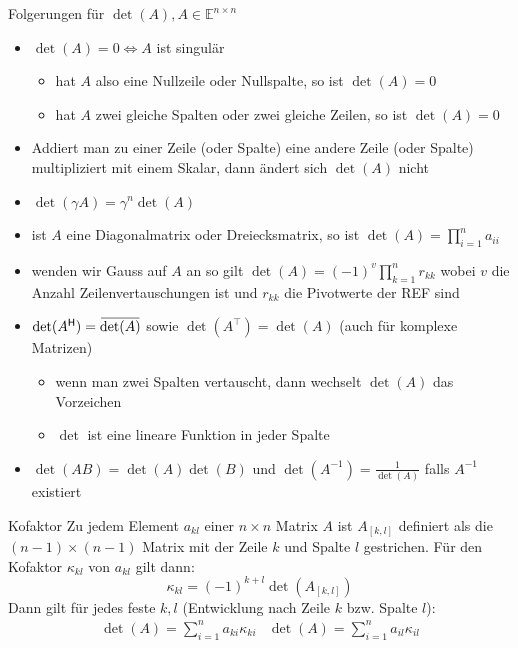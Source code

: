 \documentclass[a4paper,10pt]{article}
\newcommand*{\hermconj}{\mathsf{H}}
\def\E{\mathbb{E}}
\newcommand{\overbar}[1]{\mkern 1.5mu\overline{\mkern-1.5mu#1\mkern-1.5mu}\mkern 1.5mu}
\begin{document}
\begin{subbox}{Folgerungen für $\det(A), A \in \E^{n \times n}$}
  \begin{itemize}
    \item {
      $\det(A) = 0 \iff A$ ist singulär
      \begin{itemize}
        \item hat $A$ also eine Nullzeile oder Nullspalte, so ist $\det(A) = 0$
        \item hat $A$ zwei gleiche Spalten oder zwei gleiche Zeilen, so ist $\det(A) = 0$
      \end{itemize}
    }
    \item Addiert man zu einer Zeile (oder Spalte) eine andere Zeile (oder Spalte) multipliziert mit einem Skalar, dann ändert sich $\det(A)$ nicht
    \item $\det(\gamma A) = \gamma^n \det(A)$
    \item ist $A$ eine Diagonalmatrix oder Dreiecksmatrix, so ist $\det(A) = \prod_{i=1}^n a_{ii}$
    \item wenden wir Gauss auf $A$ an so gilt $\det(A) = (-1)^v \prod_{k=1}^n r_{kk}$ wobei $v$ die Anzahl Zeilenvertauschungen ist und $r_{kk}$ die Pivotwerte der REF sind
    \item{
      $\det(A^\hermconj) = \overbar{\det(A)}$ sowie $\det(A^\top) = \det(A)$ (auch für komplexe Matrizen)
      \begin{itemize}
        \item wenn man zwei Spalten vertauscht, dann wechselt $\det(A)$ das Vorzeichen
        \item $\det$ ist eine lineare Funktion in jeder Spalte
      \end{itemize}
    }
    \item $\det(AB) = \det(A) \det(B)$ und $\det(A^{-1}) = \frac{1}{\det(A)}$ falls $A^{-1}$ existiert
  \end{itemize}
\end{subbox}

\begin{subbox}{Kofaktor }
  Zu jedem Element $a_{kl}$ einer $n \times n$ Matrix $A$ ist $A_{[k,l]}$ definiert als die $(n-1) \times (n-1)$ Matrix mit der Zeile $k$ und Spalte $l$ gestrichen. Für den Kofaktor $\kappa_{kl}$ von $a_{kl}$ gilt dann:
  $$\kappa_{kl} = (-1)^{k+l} \det(A_{[k,l]})$$
  Dann gilt für jedes feste $k, l$ (Entwicklung nach Zeile $k$ bzw. Spalte $l$):
  \begin{align*}
    & \det(A) = \sum_{i=1}^n a_{ki} \kappa_{ki} & \det(A) = \sum_{i=1}^n a_{il} \kappa_{il} &
  \end{align*}
\end{subbox}
\end{document}
